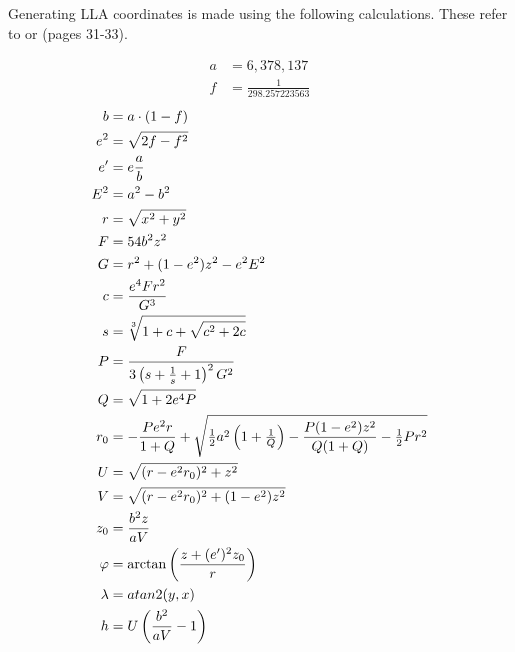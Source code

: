 Generating LLA coordinates is made using the following calculations. These refer to \cite{wiki:1} or \cite{Wendel__2007}(pages 31-33).

\begin{align}
a	&= 6,378,137										\\
f	&= \frac{1}{298.257223563}							
\end{align}
\begin{align}
b	&= a \multiplication (1-f)							\\
e^2	&= \sqrt{2f-f^2}									\\
e'	&= e \frac{a}{b}									\\
E^2	&= a^2-b^2											\\
r	&= \sqrt{ x^2 + y^2}								\\
F	&= 54 b^2 z^2										\\
G	&= r^2 + (1-e^2)z^2-e^2E^2							\\
c	&= \frac{e^4Fr^2}{G^3}								\\
s	&= \sqrt[3]{1+c+\sqrt{c^2+2c}}						\\
P	&= \frac{F}{3\left(s+\tfrac 1 s + 1\right)^2 G^2}	\\
Q	&= \sqrt{1+2e^4P}									\\
r_0	&= -\frac{Pe^2r}{1+Q} + \sqrt{\tfrac 1 2 a^2 \left(1 + \tfrac 1 Q \right) - \frac{P(1-e^2)z^2}{Q(1+Q)}-\tfrac 1 2 P r^2}	\\
U	&= \sqrt{(r-e^2r_0)^2+z^2}							\\
V	&= \sqrt{(r-e^2r_0)^2+(1-e^2)z^2}					\\
z_0	&= \frac{b^2z}{aV}									\\
\lat	&= \arctan \left( \frac{z+(e')^2z_0} r \right)	\\
\lon	&= atan2(y,x)									\\
h	&= U \left( \frac{b^2}{aV} - 1 \right)
\end{align}
